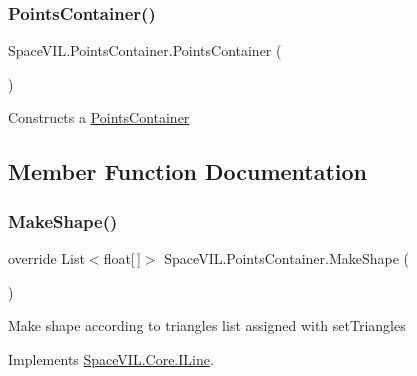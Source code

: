 \subsubsection{\texorpdfstring{Points\+Container()}{PointsContainer()}}
{\footnotesize\ttfamily Space\+V\+I\+L.\+Points\+Container.\+Points\+Container (\begin{DoxyParamCaption}{ }\end{DoxyParamCaption})\hspace{0.3cm}{\ttfamily [inline]}}



Constructs a \mbox{\hyperlink{class_space_v_i_l_1_1_points_container}{Points\+Container}} 



\subsection{Member Function Documentation}
\mbox{\label{class_space_v_i_l_1_1_points_container_a7fd8cf39e463780c871d538b884a3fdb}} 
\subsubsection{\texorpdfstring{Make\+Shape()}{MakeShape()}}
{\footnotesize\ttfamily override List$<$float\mbox{[}$\,$\mbox{]}$>$ Space\+V\+I\+L.\+Points\+Container.\+Make\+Shape (\begin{DoxyParamCaption}{ }\end{DoxyParamCaption})\hspace{0.3cm}{\ttfamily [inline]}}



Make shape according to triangles list assigned with set\+Triangles 



Implements \mbox{\hyperlink{interface_space_v_i_l_1_1_core_1_1_i_line}{Space\+V\+I\+L.\+Core.\+I\+Line}}.

\mbox{\label{class_space_v_i_l_1_1_points_container_a8e72d762905dd7f4a8d27863a36be99c}} 

